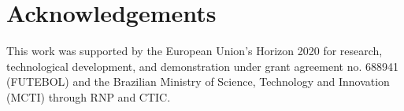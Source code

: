 \section{Acknowledgements}
\label{sec:Ack}

This work was supported by the European Union’s Horizon 2020 for research, technological development, and demonstration under grant agreement no. 688941 (FUTEBOL) and the Brazilian Ministry of Science, Technology and Innovation (MCTI) through RNP and CTIC.